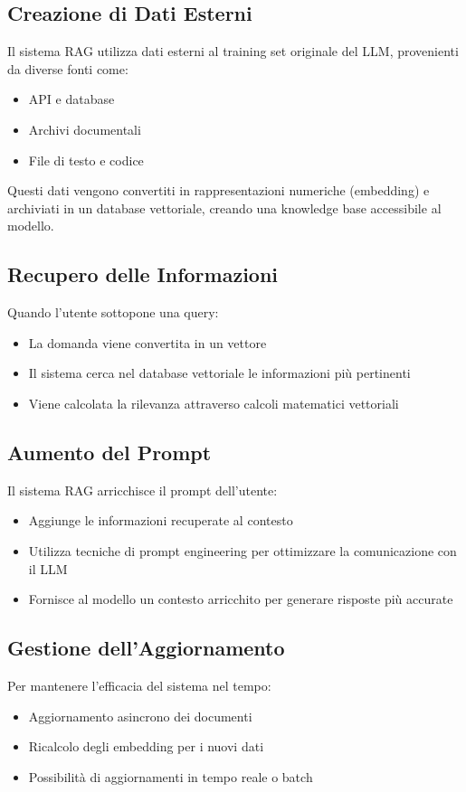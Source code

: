 \documentclass[12pt,a4paper,openright,twoside]{book}
\begin{document}
\subsection{Creazione di Dati Esterni}
Il sistema RAG utilizza dati esterni al training set originale del LLM, provenienti da diverse fonti come:
\begin{itemize}
    \item API e database
    \item Archivi documentali
    \item File di testo e codice
\end{itemize}
Questi dati vengono convertiti in rappresentazioni numeriche (embedding) e archiviati in un database vettoriale, creando una knowledge base accessibile al modello.

\subsection{Recupero delle Informazioni}
Quando l'utente sottopone una query:
\begin{itemize}
    \item La domanda viene convertita in un vettore
    \item Il sistema cerca nel database vettoriale le informazioni più pertinenti
    \item Viene calcolata la rilevanza attraverso calcoli matematici vettoriali
\end{itemize}

\subsection{Aumento del Prompt}
Il sistema RAG arricchisce il prompt dell'utente:
\begin{itemize}
    \item Aggiunge le informazioni recuperate al contesto
    \item Utilizza tecniche di prompt engineering per ottimizzare la comunicazione con il LLM
    \item Fornisce al modello un contesto arricchito per generare risposte più accurate
\end{itemize}

\subsection{Gestione dell'Aggiornamento}
Per mantenere l'efficacia del sistema nel tempo:
\begin{itemize}
    \item Aggiornamento asincrono dei documenti
    \item Ricalcolo degli embedding per i nuovi dati
    \item Possibilità di aggiornamenti in tempo reale o batch
\end{itemize}
\end{document}
